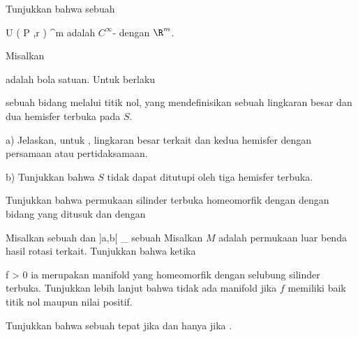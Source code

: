 {}
{

Tunjukkan bahwa sebuah

\mavergleichskette
{\vergleichskette
{ U \left(   P ,r  \right)
}
{ \subseteq }{ \R^m
}
{  }{
}
{    }{
}
{   }{
}
}
{}{}{}
adalah $C^\infty$-
dengan $\R^m$.

}
{} {}

{}
{

Misalkan

 {  }

adalah bola satuan. Untuk
 berlaku

 {  }

sebuah bidang melalui titik nol, yang mendefinisikan sebuah lingkaran besar
 {} {}
dan dua hemisfer terbuka pada $S$.

a) Jelaskan, untuk
, lingkaran besar terkait dan kedua hemisfer dengan persamaan atau pertidaksamaan.

b) Tunjukkan bahwa $S$ tidak dapat ditutupi oleh tiga hemisfer terbuka.

}
{} {}

{}
{

Tunjukkan bahwa permukaan silinder terbuka
\mathl{S^1 \times {]0,1[}}{} homeomorfik dengan
 dengan bidang yang ditusuk
 dan dengan

}
{} {}

{}
{

Misalkan
\mathl{]a,b[}{} sebuah
dan
 {]a,b[} {\R_{}
} {}
sebuah
Misalkan $M$ adalah permukaan luar benda hasil rotasi terkait. Tunjukkan bahwa ketika

\mavergleichskette
{\vergleichskette
{ f
}
{ > }{ 0
}
{  }{
}
{    }{
}
{   }{
}
}
{}{}{}
ia merupakan manifold yang homeomorfik dengan selubung silinder terbuka. Tunjukkan lebih lanjut bahwa tidak ada manifold jika $f$ memiliki baik titik nol maupun nilai positif.

}
{} {}

{}
{

Tunjukkan bahwa sebuah
tepat jika dan hanya jika
.

}
{} {}

